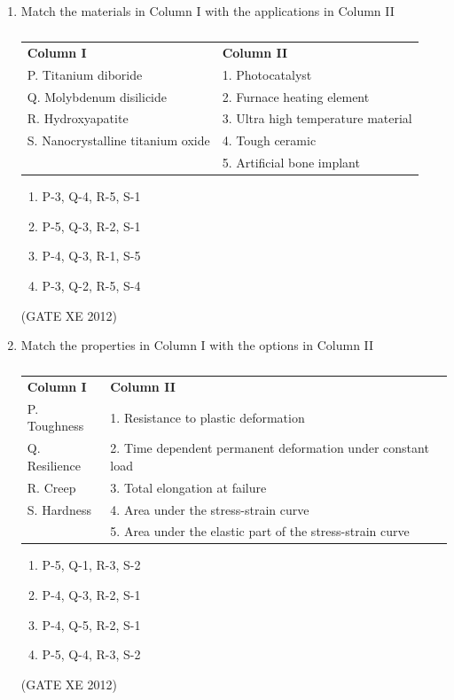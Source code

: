 \documentclass[12pt]{article}
\begin{document}
\begin{enumerate}
\item Match the materials in Column I with the applications in Column II

\begin{table}[h]
\centering
\begin{tabular}{l l}
\textbf{Column I} & \textbf{Column II} \\
P. Titanium diboride & 1. Photocatalyst \\
Q. Molybdenum disilicide & 2. Furnace heating element \\
R. Hydroxyapatite & 3. Ultra high temperature material \\
S. Nanocrystalline titanium oxide & 4. Tough ceramic \\
& 5. Artificial bone implant \\
\end{tabular}
\caption{}
\label{}
\end{table}

\begin{multicols}{2}
\begin{enumerate}
\item P-3, Q-4, R-5, S-1
\item P-5, Q-3, R-2, S-1
\item P-4, Q-3, R-1, S-5
\item P-3, Q-2, R-5, S-4
\end{enumerate}
\end{multicols}
(GATE XE 2012)

\item Match the properties in Column I with the options in Column II

\begin{table}[h]
\centering
\begin{tabular}{l l}
\textbf{Column I} & \textbf{Column II} \\
P. Toughness & 1. Resistance to plastic deformation \\
Q. Resilience & 2. Time dependent permanent deformation under constant load \\
R. Creep & 3. Total elongation at failure \\
S. Hardness & 4. Area under the stress-strain curve \\
& 5. Area under the elastic part of the stress-strain curve \\
\end{tabular}
\caption{}
\label{}
\end{table}

\begin{multicols}{2}
\begin{enumerate}
\item P-5, Q-1, R-3, S-2
\item P-4, Q-3, R-2, S-1
\item P-4, Q-5, R-2, S-1
\item P-5, Q-4, R-3, S-2
\end{enumerate}
\end{multicols}
(GATE XE 2012)


\end{enumerate}
\end{document}
